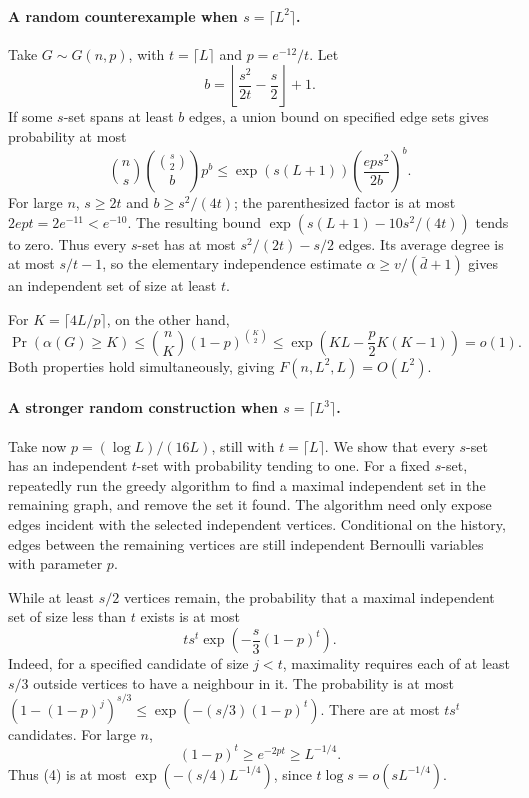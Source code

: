\paragraph{A random counterexample when \(s=\lceil L^2\rceil\).}
Take \(G\sim G(n,p)\), with \(t=\lceil L\rceil\) and
\(p=e^{-12}/t\).
Let
\[
 b=\left\lfloor\frac{s^2}{2t}-\frac s2\right\rfloor+1.
\]
If some \(s\)-set spans at least \(b\) edges, a union bound
on specified edge sets gives probability at most
\[
 \binom ns\binom{\binom s2}{b}p^b
 \leq\exp(s(L+1))
       \left(\frac{eps^2}{2b}\right)^b.
\]
For large \(n\), \(s\geq2t\) and \(b\geq s^2/(4t)\);
the parenthesized factor is at most
\(2ept=2e^{-11}<e^{-10}\).
The resulting bound
\(\exp(s(L+1)-10s^2/(4t))\) tends to zero.
Thus every \(s\)-set has at most \(s^2/(2t)-s/2\) edges.
Its average degree is at most \(s/t-1\), so the elementary
independence estimate \(\alpha\geq v/(\bar d+1)\)
gives an independent set of size at least \(t\).

For \(K=\lceil4L/p\rceil\), on the other hand,
\[
 \Pr(\alpha(G)\geq K)
 \leq\binom nK(1-p)^{\binom K2}
 \leq\exp\left(KL-\frac p2K(K-1)\right)=o(1).
                                                               \tag{3}
\]
Both properties hold simultaneously, giving
\(F(n,L^2,L)=O(L^2)\).

\paragraph{A stronger random construction when \(s=\lceil L^3\rceil\).}
Take now \(p=(\log L)/(16L)\), still with \(t=\lceil L\rceil\).
We show that every \(s\)-set has an independent \(t\)-set
with probability tending to one.
For a fixed \(s\)-set, repeatedly run the greedy algorithm
to find a maximal independent set in the remaining graph,
and remove the set it found.
The algorithm need only expose edges incident with the
selected independent vertices. Conditional on the history,
edges between the remaining vertices are still independent
Bernoulli variables with parameter \(p\).

While at least \(s/2\) vertices remain, the probability
that a maximal independent set of size less than \(t\)
exists is at most
\[
 t s^t\exp\left(-\frac s3(1-p)^t\right).                       \tag{4}
\]
Indeed, for a specified candidate of size \(j<t\), maximality
requires each of at least \(s/3\) outside vertices to have
a neighbour in it. The probability is at most
\((1-(1-p)^j)^{s/3}\leq\exp(-(s/3)(1-p)^t)\).
There are at most \(ts^t\) candidates.
For large \(n\),
\[
 (1-p)^t\geq e^{-2pt}\geq L^{-1/4}.
\]
Thus (4) is at most
\(\exp(-(s/4)L^{-1/4})\), since \(t\log s=o(sL^{-1/4})\).

